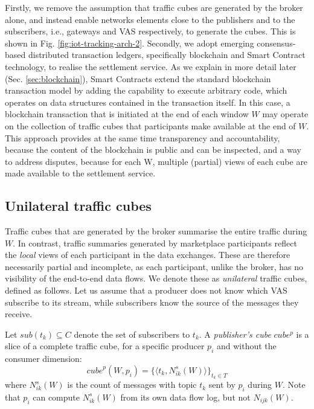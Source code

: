 \documentclass[chi_draft]{sigchi}
\begin{document}
Firstly, we remove the assumption that traffic cubes are generated by the broker alone, and instead enable networks elements close to the publishers and to the subscribers, i.e., gateways and VAS respectively, to generate the cubes. This is shown in Fig. \ref{fig:iot-tracking-arch-2}.
%
Secondly, we adopt emerging consensus-based distributed transaction ledgers, specifically blockchain and Smart Contract technology, to realise the settlement service.
As we explain in more detail later (Sec. \ref{sec:blockchain}), Smart Contracts extend the standard blockchain transaction model by adding the capability to execute arbitrary code, which operates on data structures contained in the transaction itself. 
In this case, a blockchain transaction that is initiated at the end of each window $W$ may operate on the collection of traffic cubes that participants make available at the end of $W$.
This  approach provides at the same time transparency and accountability, because the content of the blockchain is public and can be inspected, and a way to address disputes, because for each W, multiple (partial) views of each cube are made available to the settlement service.

\subsection{Unilateral traffic cubes} \label{sec:u-cubes}
Traffic cubes that are generated by the broker summarise the entire traffic during $W$.
In contrast, traffic summaries generated by marketplace participants reflect the \textit{local} views of each participant in the data exchanges.
These are therefore necessarily partial and incomplete, as each participant, unlike the broker, has no visibility of the end-to-end data flows. 
We denote these as \textit{unilateral} traffic cubes, defined as follows.
Let us assume that a producer does not know which VAS subscribe to its stream, while subscribers know the source of the messages they receive. 

Let $\mathit{sub}(t_k) \subseteq C $ denote the set of subscribers to $t_k$.
%
A \textit{publisher's cube} $\mathit{cube^p}$ is a slice of a complete traffic cube, for a specific producer $p_i$ and without the consumer dimension:
\[
\mathit{cube}^p(W, p_i)  =  \{ \langle t_k,  N^s_{ik}(W) \rangle \}_{t_k \in T}
\]
where $N^s_{ik}(W)$ is the count of messages with topic $t_k$ sent by $p_i$ during $W$.
Note that $ p_i $ can compute $ N^s_{ik}(W)  $ from its own data flow log, but not $ N_{ijk}(W)  $.
\end{document}
